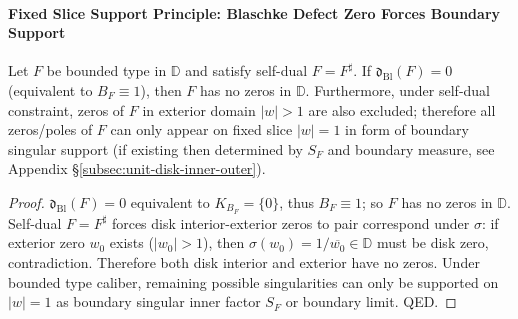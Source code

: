\paragraph{Fixed Slice Support Principle: Blaschke Defect Zero Forces Boundary Support}
\begin{theorem}\label{thm:blaschke-defect-zero-fixed-slice-support}
Let \(F\) be bounded type in \(\mathbb{D}\) and satisfy self-dual \(F=F^\sharp\).
If \(\mathfrak{d}_{\mathrm{Bl}}(F)=0\) (equivalent to \(B_F\equiv 1\)), then \(F\) has no zeros in \(\mathbb{D}\).
Furthermore, under self-dual constraint, zeros of \(F\) in exterior domain \(|w|>1\) are also excluded; therefore all zeros/poles of \(F\) can only appear on fixed slice \(|w|=1\) in form of boundary singular support (if existing then determined by \(S_F\) and boundary measure, see Appendix \S\ref{subsec:unit-disk-inner-outer}).
\end{theorem}

\begin{proof}
\(\mathfrak{d}_{\mathrm{Bl}}(F)=0\) equivalent to \(K_{B_F}=\{0\}\), thus \(B_F\equiv 1\); so \(F\) has no zeros in \(\mathbb{D}\).
Self-dual \(F=F^\sharp\) forces disk interior-exterior zeros to pair correspond under \(\sigma\): if exterior zero \(w_0\) exists (\(|w_0|>1\)), then \(\sigma(w_0)=1/\overline{w_0}\in\mathbb{D}\) must be disk zero, contradiction.
Therefore both disk interior and exterior have no zeros.
Under bounded type caliber, remaining possible singularities can only be supported on \(|w|=1\) as boundary singular inner factor \(S_F\) or boundary limit.
QED.
\end{proof}

